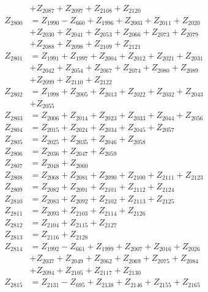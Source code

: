 \begin{multicols}{2}
\begin{align}
&+ Z_{2087} + Z_{2097} + Z_{2108} + Z_{2120} \nonumber \\
Z_{2800} &= Z_{1990} - Z_{660} + Z_{1996} + Z_{2003} + Z_{2011} + Z_{2020}  \nonumber \\
&+ Z_{2030} + Z_{2041} + Z_{2053} + Z_{2066} + Z_{2073} + Z_{2079}  \nonumber \\
&+ Z_{2088} + Z_{2098} + Z_{2109} + Z_{2121} \nonumber \\
Z_{2801} &= Z_{1991} + Z_{1997} + Z_{2004} + Z_{2012} + Z_{2021} + Z_{2031}  \nonumber \\
&+ Z_{2042} + Z_{2054} + Z_{2067} + Z_{2074} + Z_{2080} + Z_{2089}  \nonumber \\
&+ Z_{2099} + Z_{2110} + Z_{2122} \nonumber \\
Z_{2802} &= Z_{1998} + Z_{2005} + Z_{2013} + Z_{2022} + Z_{2032} + Z_{2043}  \nonumber \\
&+ Z_{2055} \nonumber \\
Z_{2803} &= Z_{2006} + Z_{2014} + Z_{2023} + Z_{2033} + Z_{2044} + Z_{2056} \nonumber \\
Z_{2804} &= Z_{2015} + Z_{2024} + Z_{2034} + Z_{2045} + Z_{2057} \nonumber \\
Z_{2805} &= Z_{2025} + Z_{2035} + Z_{2046} + Z_{2058} \nonumber \\
Z_{2806} &= Z_{2036} + Z_{2047} + Z_{2059} \nonumber \\
Z_{2807} &= Z_{2048} + Z_{2060} \nonumber \\
Z_{2808} &= Z_{2068} + Z_{2081} + Z_{2090} + Z_{2100} + Z_{2111} + Z_{2123} \nonumber \\
Z_{2809} &= Z_{2082} + Z_{2091} + Z_{2101} + Z_{2112} + Z_{2124} \nonumber \\
Z_{2810} &= Z_{2083} + Z_{2092} + Z_{2102} + Z_{2113} + Z_{2125} \nonumber \\
Z_{2811} &= Z_{2093} + Z_{2103} + Z_{2114} + Z_{2126} \nonumber \\
Z_{2812} &= Z_{2104} + Z_{2115} + Z_{2127} \nonumber \\
Z_{2813} &= Z_{2116} + Z_{2128} \nonumber \\
Z_{2814} &= Z_{1992} - Z_{661} + Z_{1999} + Z_{2007} + Z_{2016} + Z_{2026}  \nonumber \\
&+ Z_{2037} + Z_{2049} + Z_{2062} + Z_{2069} + Z_{2075} + Z_{2084}  \nonumber \\
&+ Z_{2094} + Z_{2105} + Z_{2117} + Z_{2130} \nonumber \\
Z_{2815} &= Z_{2131} - Z_{695} + Z_{2138} + Z_{2146} + Z_{2155} + Z_{2165}  \nonumber \\

\end{align}
\end{multicols}
